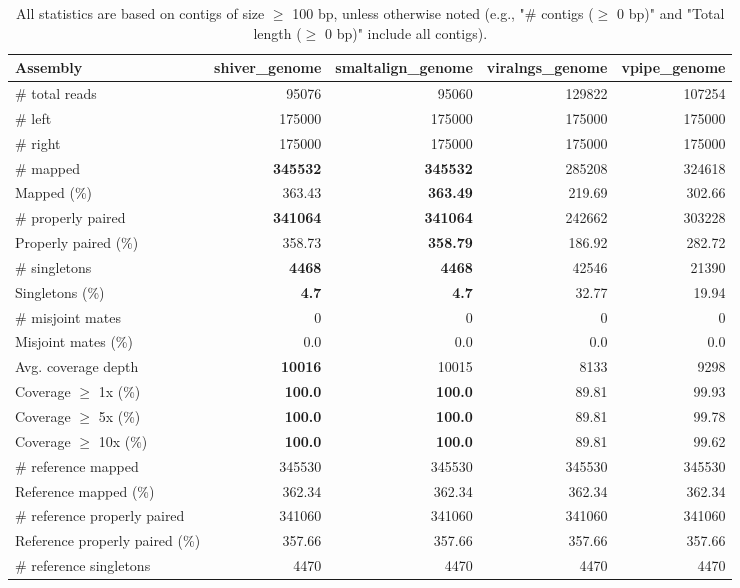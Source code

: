 \documentclass[12pt,a4paper]{article}
\begin{document}
\begin{table}[ht]
\begin{center}
\caption{All statistics are based on contigs of size $\geq$ 100 bp, unless otherwise noted (e.g., "\# contigs ($\geq$ 0 bp)" and "Total length ($\geq$ 0 bp)" include all contigs).}
\begin{tabular}{|l*{4}{|r}|}
\hline
Assembly & shiver\_genome & smaltalign\_genome & viralngs\_genome & vpipe\_genome \\ \hline
\# total reads & 95076 & 95060 & 129822 & 107254 \\ \hline
\# left & 175000 & 175000 & 175000 & 175000 \\ \hline
\# right & 175000 & 175000 & 175000 & 175000 \\ \hline
\# mapped & {\bf 345532} & {\bf 345532} & 285208 & 324618 \\ \hline
Mapped (\%) & 363.43 & {\bf 363.49} & 219.69 & 302.66 \\ \hline
\# properly paired & {\bf 341064} & {\bf 341064} & 242662 & 303228 \\ \hline
Properly paired (\%) & 358.73 & {\bf 358.79} & 186.92 & 282.72 \\ \hline
\# singletons & {\bf 4468} & {\bf 4468} & 42546 & 21390 \\ \hline
Singletons (\%) & {\bf 4.7} & {\bf 4.7} & 32.77 & 19.94 \\ \hline
\# misjoint mates & 0 & 0 & 0 & 0 \\ \hline
Misjoint mates (\%) & 0.0 & 0.0 & 0.0 & 0.0 \\ \hline
Avg. coverage depth & {\bf 10016} & 10015 & 8133 & 9298 \\ \hline
Coverage $\geq$ 1x (\%) & {\bf 100.0} & {\bf 100.0} & 89.81 & 99.93 \\ \hline
Coverage $\geq$ 5x (\%) & {\bf 100.0} & {\bf 100.0} & 89.81 & 99.78 \\ \hline
Coverage $\geq$ 10x (\%) & {\bf 100.0} & {\bf 100.0} & 89.81 & 99.62 \\ \hline
\# reference mapped & 345530 & 345530 & 345530 & 345530 \\ \hline
Reference mapped (\%) & 362.34 & 362.34 & 362.34 & 362.34 \\ \hline
\# reference properly paired & 341060 & 341060 & 341060 & 341060 \\ \hline
Reference properly paired (\%) & 357.66 & 357.66 & 357.66 & 357.66 \\ \hline
\# reference singletons & 4470 & 4470 & 4470 & 4470 \\ \hline

\end{tabular}
\end{center}
\end{table}
\end{document}
